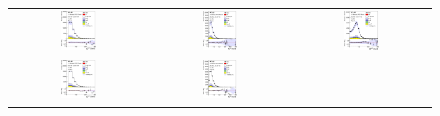 \begin{figure}[tp]
  \centering
  \begin{tabular}{ccc}
  \includegraphics[width=0.27\textwidth]{Analysis/Figures_ttH/tesis_vars/prefit/lep_pt_5jetex2btagex.eps} &
  \includegraphics[width=0.27\textwidth]{Analysis/Figures_ttH/tesis_vars/prefit/met_5jetex2btagex.eps} &
  \includegraphics[width=0.27\textwidth]{Analysis/Figures_ttH/tesis_vars/prefit/WlepMT_5jetex2btagex.eps} \\
  \includegraphics[width=0.27\textwidth]{Analysis/Figures_ttH/tesis_vars/postfit/lep_pt_5jetex2btagex.eps} &
  \includegraphics[width=0.27\textwidth]{Analysis/Figures_ttH/tesis_vars/postfit/met_5jetex2btagex.eps} &

\end{tabular}
\end{figure}
